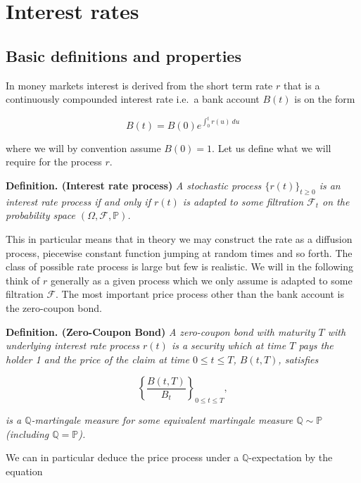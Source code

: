 \documentclass[
]{book}
\begin{document}
\hypertarget{interest-rates}{%
\section{Interest rates}\label{interest-rates}}

\hypertarget{basic-definitions-and-properties}{%
\subsection{Basic definitions and properties}\label{basic-definitions-and-properties}}

In money markets interest is derived from the short term rate \(r\) that is a continuously compounded interest rate i.e.~a bank account \(B(t)\) is on the form

\[
B(t)=B(0)e^{\int_0^tr(u)\ du}
\]

where we will by convention assume \(B(0)=1\). Let us define what we will require for the process \(r\).

\textbf{Definition. (Interest rate process)} \emph{A stochastic process \(\{r(t)\}_{t\ge 0}\) is an interest rate process if and only if \(r(t)\) is adapted to some filtration \(\mathcal F_t\) on the probability space \((\Omega,\mathcal F,\mathbb P)\).}

This in particular means that in theory we may construct the rate as a diffusion process, piecewise constant function jumping at random times and so forth. The class of possible rate process is large but few is realistic. We will in the following think of \(r\) generally as a given process which we only assume is adapted to some filtration \(\mathcal F\). The most important price process other than the bank account is the zero-coupon bond.

\textbf{Definition. (Zero-Coupon Bond)} \emph{A zero-coupon bond with maturity \(T\) with underlying interest rate process \(r(t)\) is a security which at time \(T\) pays the holder 1 and the price of the claim at time \(0\le t\le T\), \(B(t,T)\), satisfies}

\[
\left\{\frac{B(t,T)}{B_t}\right\}_{0\le t\le T},
\]

\emph{is a \(\mathbb Q\)-martingale measure for some equivalent martingale measure \(\mathbb Q\sim \mathbb P\) (including \(\mathbb Q = \mathbb P\)).}

We can in particular deduce the price process under a \(\mathbb Q\)-expectation by the equation
\end{document}
